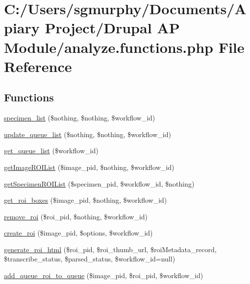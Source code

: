 \hypertarget{analyze_8functions_8php}{
\section{C:/Users/sgmurphy/Documents/Apiary Project/Drupal AP Module/analyze.functions.php File Reference}
\label{analyze_8functions_8php}
}
\subsection*{Functions}
\begin{DoxyCompactItemize}
\item 
\hyperlink{analyze_8functions_8php_a569ab637484bb1b9bcd0ce7571dd5f95}{specimen\_\-list} (\$nothing, \$nothing, \$workflow\_\-id)
\item 
\hyperlink{analyze_8functions_8php_ad13e1985dddb1173b5cc748c11990c65}{update\_\-queue\_\-list} (\$nothing, \$nothing, \$workflow\_\-id)
\item 
\hyperlink{analyze_8functions_8php_afa0647e1c898c93547dcb3f7b7d8ceda}{get\_\-queue\_\-list} (\$workflow\_\-id)
\item 
\hyperlink{analyze_8functions_8php_a5dd4d25616cb603dea2f5214f643bfb0}{getImageROIList} (\$image\_\-pid, \$nothing, \$workflow\_\-id)
\item 
\hyperlink{analyze_8functions_8php_a6e2ed9556330362fb26ad4654e83f932}{getSpecimenROIList} (\$specimen\_\-pid, \$workflow\_\-id, \$nothing)
\item 
\hyperlink{analyze_8functions_8php_af0279594674a2ff529d0fe3bfa916a05}{get\_\-roi\_\-boxes} (\$image\_\-pid, \$nothing, \$workflow\_\-id)
\item 
\hyperlink{analyze_8functions_8php_ac3ad306edba53178755f1e17ba3ef052}{remove\_\-roi} (\$roi\_\-pid, \$nothing, \$workflow\_\-id)
\item 
\hyperlink{analyze_8functions_8php_a82d69f9619642c6bb08dc1d7ea672027}{create\_\-roi} (\$image\_\-pid, \$options, \$workflow\_\-id)
\item 
\hyperlink{analyze_8functions_8php_aa7f7268265f4049f5877aea14e6e1640}{generate\_\-roi\_\-html} (\$roi\_\-pid, \$roi\_\-thumb\_\-url, \$roiMetadata\_\-record, \$transcribe\_\-status, \$parsed\_\-status, \$workflow\_\-id=null)
\item 
\hyperlink{analyze_8functions_8php_a017338342276e0f6727737108e7cee43}{add\_\-queue\_\-roi\_\-to\_\-queue} (\$image\_\-pid, \$roi\_\-pid, \$workflow\_\-id)

\end{DoxyCompactItemize}
